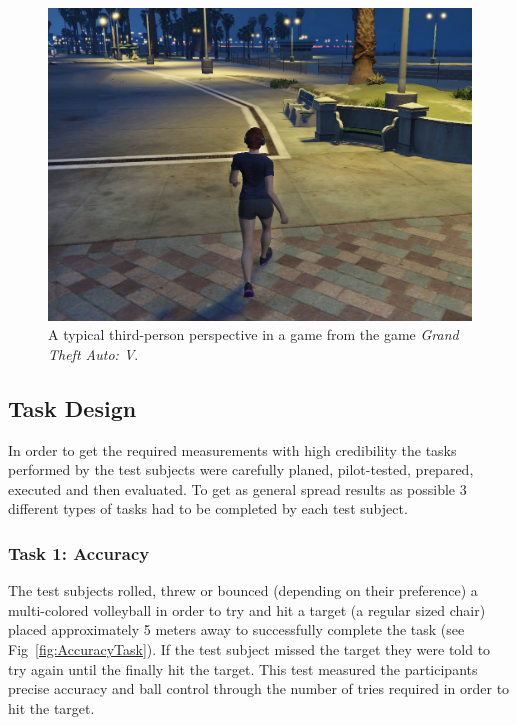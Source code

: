 \documentclass[runningheads,a4paper,oribibl]{llncs}
\begin{document}
\begin{figure}
   \centering
   \includegraphics[width=\textwidth]{ExternalMaterial/GTA}
   \caption{A typical third-person perspective in a game from the game \emph{Grand Theft Auto: V}. \label{fig:GTAIV}}
\end{figure}




\subsection{Task Design} \label{subsec:TaskDesign}

In order to get the required measurements with high credibility the tasks performed by the test subjects were carefully planed, pilot-tested, prepared, executed and then evaluated. To get as general spread results as possible 3 different types of tasks had to be completed by each test subject.

\subsubsection{Task 1: Accuracy}

The test subjects rolled, threw or bounced (depending on their preference) a multi-colored volleyball in order to try and hit a target (a regular sized chair) placed approximately 5 meters away to successfully complete the task (see Fig~\ref{fig:AccuracyTask}). If the test subject missed the target they were told to try again until the finally hit the target. This test measured the participants precise accuracy and ball control through the number of tries required in order to hit the target.
\end{document}
